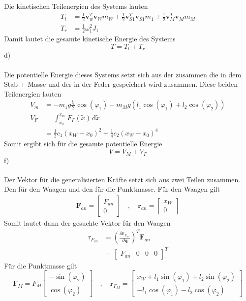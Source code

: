 Die kinetischen Teilenergien des Systems lauten
\begin{align*}
	T_t &= \frac{1}{2}\textbf{v}^T_w\textbf{v}_W m_W + \frac{1}{2}\textbf{v}^T_{S1}\textbf{v}_{S1}m_1 + \frac{1}{2}\textbf{v}^T_M\textbf{v}_Mm_M \\
	T_r &= \frac{1}{2} \omega_1^2J_1
\end{align*}
Damit lautet die gesamte kinetische Energie des Systems
\[
	T = T_t + T_r
\]
\newpage
\noindent
d)\\ \\
Die potentielle Energie dieses Systems setzt sich aus der zusammen die in dem Stab + Masse und der in der Feder gespeichert wird zusammen. Diese beiden Teilenergien lauten
\begin{align*}
	V_m &= -m_1g\frac{l_1}{2}\cos(\varphi_1) - m_Mg\left(l_1\cos(\varphi_1) + l_2\cos(\varphi_2)\right) \\
	V_F &= \int_{x_0}^{x_W}F_F(\tilde{x})\,\text{d}\tilde{x} \\
		&= \frac{1}{2}c_1(x_W - x_0)^2 + \frac{1}{4}c_2(x_W - x_0)^4
\end{align*}
Somit ergibt sich für die gesamte potentielle Energie 
\[
	V = V_M + V_F
\]
f)\\ \\
Der Vektor für die generalisierten Kräfte setzt sich aus zwei Teilen zusammen. Den für den Waagen und den für die Punktmasse.
Für den Waagen gilt
\begin{align*}
	\textbf{F}_{an} = \begin{bmatrix}
		F_{an} \\
		0
	\end{bmatrix}
	\quad,\quad
	\textbf{r}_{an} = \begin{bmatrix}
		x_W \\
		0
	\end{bmatrix}
\end{align*}
Somit lautet dann der gesuchte Vektor für den Waagen
\begin{align*}
		\tau_{F_{an}} &= \left(\frac{\partial \textbf{r}_{F_{an}}}{\partial \textbf{q}}\right)^T \textbf{F}_{an} \\
		&= \begin{bmatrix}
			F_{an} & 0 & 0 & 0
		\end{bmatrix}^T
\end{align*}
Für die Punktmasse gilt
\[
	\textbf{F}_M = F_M\begin{bmatrix}
		-\sin(\varphi_2) \\
		\cos(\varphi_2)
	\end{bmatrix}
	\quad,\quad
	\textbf{r}_{F_M} = \begin{bmatrix}
		x_W + l_1\sin(\varphi_1) + l_2\sin(\varphi_2) \\
		-l_1\cos(\varphi_1) - l_2\cos(\varphi_2)
	\end{bmatrix}
\]

